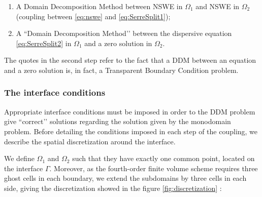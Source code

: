 \begin{enumerate}
	\item A Domain Decomposition Method between NSWE in $\Omega_1$ and NSWE in $\Omega_2$ (coupling between \eqref{eq:nswe} and \eqref{eq:SerreSplit1});
	\item A ``Domain Decomposition Method’’ between the dispersive equation \eqref{eq:SerreSplit2} in $\Omega_1$ and a zero solution in $\Omega_2$.
\end{enumerate}

\indent The quotes in the second step refer to the fact that a DDM between an equation and a zero solution is, in fact, a Transparent Boundary Condition problem.

\subsubsection{The interface conditions}

\indent Appropriate interface conditions must be imposed in order to the DDM problem give ``correct’’ solutions regarding the solution given by the monodomain problem. Before detailing the conditions imposed in each step of the coupling, we describe the spatial discretization around the interface.

\indent We define $\Omega_1$ and $\Omega_2$ such that they have exactly one common point, located on the interface $\Gamma$. Moreover, as the fourth-order finite volume scheme requires three ghost cells in each boundary, we extend the subdomains by three cells in each side, giving the discretization showed in the figure \ref{fig:discretization} : 

\indent


